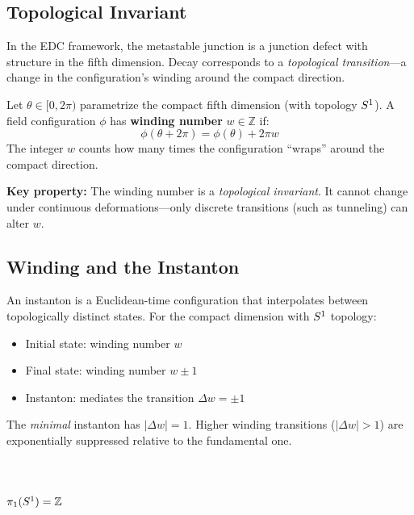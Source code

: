 \subsection{Topological Invariant}

In the EDC framework, the metastable junction is a junction defect with structure in the
fifth dimension. Decay corresponds to a \emph{topological transition}---a change
in the configuration's winding around the compact direction.

\begin{definition}
    Let $\theta \in [0, 2\pi)$ parametrize the compact fifth dimension (with
    topology $S^1$). A field configuration $\phi$ has \textbf{winding number}
    $w \in \mathbb{Z}$ if:
    \begin{equation}
        \phi(\theta + 2\pi) = \phi(\theta) + 2\pi w
        \label{eq:winding_bc}
    \end{equation}
    The integer $w$ counts how many times the configuration ``wraps'' around
    the compact direction. \tagDer
\end{definition}

\textbf{Key property:} The winding number is a \emph{topological invariant}.
It cannot change under continuous deformations---only discrete transitions
(such as tunneling) can alter $w$.

\subsection{Winding and the Instanton}

An instanton is a Euclidean-time configuration that interpolates between
topologically distinct states. For the compact dimension with $S^1$ topology:
\begin{itemize}
    \item Initial state: winding number $w$
    \item Final state: winding number $w \pm 1$
    \item Instanton: mediates the transition $\Delta w = \pm 1$
\end{itemize}

The \emph{minimal} instanton has $|\Delta w| = 1$. Higher winding transitions
($|\Delta w| > 1$) are exponentially suppressed relative to the fundamental one.

\section{$\pi_1(S^1) = \mathbb{Z}$}
\label{sec:kappa:fundamental}

